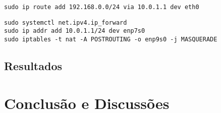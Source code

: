 \documentclass[12pt]{article}
\begin{document}
\begin{lstlisting}
sudo ip route add 192.168.0.0/24 via 10.0.1.1 dev eth0
\end{lstlisting}

\begin{lstlisting}
sudo systemctl net.ipv4.ip_forward 
sudo ip addr add 10.0.1.1/24 dev enp7s0 
sudo iptables -t nat -A POSTROUTING -o enp9s0 -j MASQUERADE 
\end{lstlisting}



\subsection{Resultados}

\section{Conclusão e Discussões}


\end{document}
